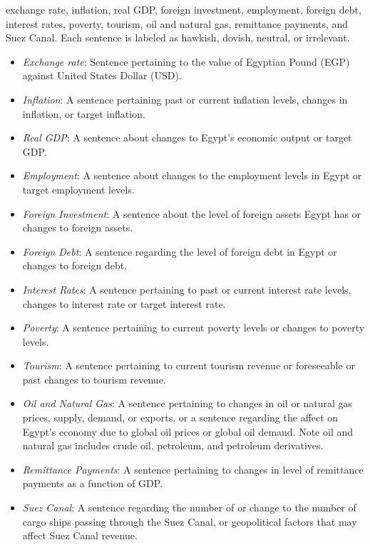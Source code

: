  exchange rate, inflation, real GDP, foreign investment, employment, foreign debt, interest rates, poverty, tourism, oil and natural gas, remittance payments, and Suez Canal. Each sentence is labeled as hawkish, dovish, neutral, or irrelevant.
\begin{itemize}
    \item \emph{Exchange rate}: Sentence pertaining to the value of Egyptian Pound (EGP) against United States Dollar (USD).
    \item \emph{Inflation}: A sentence pertaining past or current inflation levels, changes in inflation, or target inflation.
    \item \emph{Real GDP}: A sentence about changes to Egypt's economic output or target GDP.
    \item \emph{Employment}: A sentence about changes to the employment levels in Egypt or target employment levels.
    \item \emph{Foreign Investment}: A sentence about the level of foreign assets Egypt has or changes to foreign assets.
    \item \emph{Foreign Debt}: A sentence regarding the level of foreign debt in Egypt or changes to foreign debt.
    \item \emph{Interest Rates}: A sentence pertaining to past or current interest rate levels, changes to interest rate or target interest rate.
    \item \emph{Poverty}: A sentence pertaining to current poverty levels or changes to poverty levels.
    \item \emph{Tourism}: A sentence pertaining to current tourism revenue or foreseeable or past changes to tourism revenue.
    \item \emph{Oil and Natural Gas}: A sentence pertaining to changes in oil or natural gas prices, supply, demand, or exports, or a sentence regarding the affect on Egypt's economy due to global oil prices or global oil demand. Note oil and natural gas includes crude oil, petroleum, and petroleum derivatives.
    \item \emph{Remittance Payments}: A sentence pertaining to changes in level of remittance payments as a function of GDP.
    \item \emph{Suez Canal}: A sentence regarding the number of or change to the number of cargo ships passing through the Suez Canal, or geopolitical factors that may affect Suez Canal revenue.
\end{itemize}


